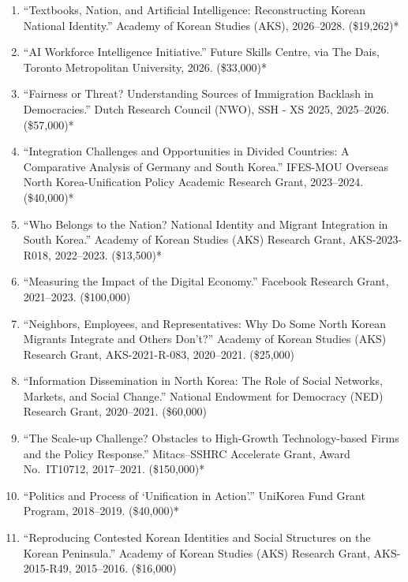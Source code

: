 \documentclass[11pt, a4paper]{article}
\begin{document}
\begin{enumerate}[itemsep=0.15em]
  \item ``Textbooks, Nation, and Artificial Intelligence: Reconstructing Korean National Identity.'' Academy of Korean Studies (AKS), 2026--2028. (\$19,262)*

  \item ``AI Workforce Intelligence Initiative.'' Future Skills Centre, via The Dais, Toronto Metropolitan University, 2026. (\$33,000)*

  \item ``Fairness or Threat? Understanding Sources of Immigration Backlash in Democracies.'' Dutch Research Council (NWO), SSH - XS 2025, 2025--2026. (\$57,000)*

  \item ``Integration Challenges and Opportunities in Divided Countries: A Comparative Analysis of Germany and South Korea.'' IFES-MOU Overseas North Korea-Unification Policy Academic Research Grant, 2023--2024. (\$40,000)*

  \item ``Who Belongs to the Nation? National Identity and Migrant Integration in South Korea.'' Academy of Korean Studies (AKS) Research Grant, AKS-2023-R018, 2022--2023. (\$13,500)*

  \item ``Measuring the Impact of the Digital Economy.'' Facebook Research Grant, 2021--2023. (\$100,000)\dag

  \item ``Neighbors, Employees, and Representatives: Why Do Some North Korean Migrants Integrate and Others Don't?'' Academy of Korean Studies (AKS) Research Grant, AKS-2021-R-083, 2020--2021. (\$25,000)\dag

  \item ``Information Dissemination in North Korea: The Role of Social Networks, Markets, and Social Change.'' National Endowment for Democracy (NED) Research Grant, 2020--2021. (\$60,000)\dag

  \item ``The Scale-up Challenge? Obstacles to High-Growth Technology-based Firms and the Policy Response.'' Mitacs--SSHRC Accelerate Grant, Award No.\ IT10712, 2017--2021. (\$150,000)*

  \item ``Politics and Process of `Unification in Action'.'' UniKorea Fund Grant Program, 2018--2019. (\$40,000)*

  \item ``Reproducing Contested Korean Identities and Social Structures on the Korean Peninsula.'' Academy of Korean Studies (AKS) Research Grant, AKS-2015-R49, 2015--2016. (\$16,000)\dag


\end{enumerate}
\end{document}
